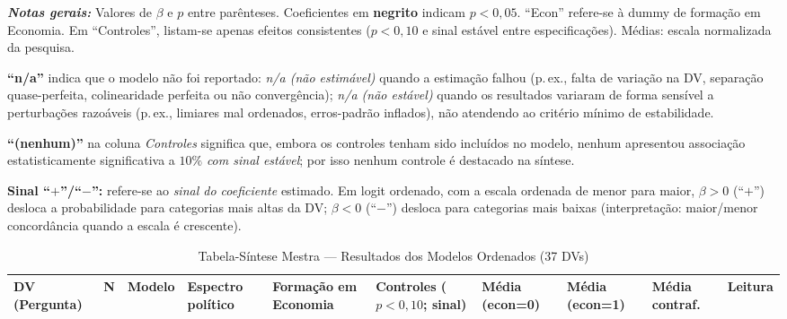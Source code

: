 \begin{apendicesenv}
\begin{landscape}
\begin{ThreePartTable}
\begin{TableNotes}[flushleft]\footnotesize
\item \textit{\textbf{Notas gerais:}} Valores de $\beta$ e $p$ entre parênteses. Coeficientes em \textbf{negrito} indicam $p<0{,}05$. ``Econ'' refere-se à dummy de formação em Economia. Em ``Controles'', listam-se apenas efeitos consistentes ($p<0{,}10$ e sinal estável entre especificações). Médias: escala normalizada da pesquisa.
\item \textbf{``n/a''} indica que o modelo não foi reportado: \textit{n/a (não estimável)} quando a estimação falhou (p.\,ex., falta de variação na DV, separação quase-perfeita, colinearidade perfeita ou não convergência); \textit{n/a (não estável)} quando os resultados variaram de forma sensível a perturbações razoáveis (p.\,ex., limiares mal ordenados, erros-padrão inflados), não atendendo ao critério mínimo de estabilidade.
\item \textbf{``(nenhum)''} na coluna \emph{Controles} significa que, embora os controles tenham sido incluídos no modelo, nenhum apresentou associação estatisticamente significativa a $10\%$ \emph{com sinal estável}; por isso nenhum controle é destacado na síntese.
\item \textbf{Sinal ``$+$''/``$-$'':} refere-se ao \emph{sinal do coeficiente} estimado. Em logit ordenado, com a escala ordenada de menor para maior, $\beta>0$ (``$+$'') desloca a probabilidade para categorias mais altas da DV; $\beta<0$ (``$-$'') desloca para categorias mais baixas (interpretação: maior/menor concordância quando a escala é crescente).
\end{TableNotes}

\begin{longtable}{%
  >{\RaggedRight\arraybackslash}p{3.0cm}
  >{\centering\arraybackslash}p{0.6cm}
  >{\RaggedRight\arraybackslash}p{2cm}
  >{\RaggedRight\arraybackslash}p{3.5cm}
  >{\RaggedRight\arraybackslash}p{3.2cm}
  >{\RaggedRight\arraybackslash}p{3.2cm}
  >{\centering\arraybackslash}p{1.2cm}
  >{\centering\arraybackslash}p{1.2cm}
  >{\centering\arraybackslash}p{1.4cm}
  >{\RaggedRight\arraybackslash}p{4.5cm}}
\caption{Tabela-Síntese Mestra — Resultados dos Modelos Ordenados (37 DVs)}\label{tab:resultados_ordenados}\\
\toprule
\textbf{DV (Pergunta)} & \textbf{N} & \textbf{Modelo} & \textbf{Espectro político} & \textbf{Formação em Economia} & \textbf{Controles ($p<0{,}10$; sinal)} & \textbf{Média (econ=0)} & \textbf{Média (econ=1)} & \textbf{Média contraf.} & \textbf{Leitura}\\
\midrule
\endfirsthead


\end{longtable}
\end{ThreePartTable}
\end{landscape}
\end{apendicesenv}
